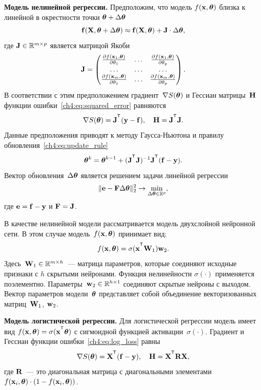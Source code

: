 \documentclass[11pt, a5paper]{dissert}
\begin{document}
\textbf{Модель нелинейной регрессии.}
Предположим, что модель $f (\mathbf{x} , \boldsymbol{\theta})$ близка к линейной в окрестности точки $\boldsymbol{\theta} + \Delta \boldsymbol{\theta}$
\[
	\mathbf{f}(\mathbf{X} , \boldsymbol{\theta} + \Delta \boldsymbol{\theta}) \approx \mathbf{f}(\mathbf{X} , \boldsymbol{\theta}) + \mathbf{J} \cdot \Delta  \boldsymbol{\theta},
\]
где $\mathbf{J} \in \mathbb{R}^{m \times p}$ является матрицой Якоби
\begin{equation*}
	\mathbf{J} = 
	\begin{pmatrix}
		\frac{\partial f(\mathbf{x}_1 , \boldsymbol{\theta})}{\partial \theta_1} & \dots & 
		\frac{\partial f(\mathbf{x}_1 , \boldsymbol{\theta})}{\partial \theta_p} \\
		\dots & \dots & \dots \\
		\frac{\partial f(\mathbf{x}_m , \boldsymbol{\theta})}{\partial \theta_1} & \dots & 
		\frac{\partial f(\mathbf{x}_m , \boldsymbol{\theta})}{\partial \theta_p}
	\end{pmatrix}.
\end{equation*}
В соответствии с этим предположением градиент~$\nabla S(\boldsymbol{\theta})$ и Гессиан матрицы~$\mathbf{H}$ функции ошибки~\eqref{ch4:eq:squared_error} равняются
\begin{equation}
	\nabla S(\btheta) = \bJ^{\T} (\by - \mathbf{f}), \quad \bH = \bJ^{\T} \bJ.
	\label{ch4:eq:nonlin_reg_deriv}
\end{equation}
Данные предположения приводят к методу Гаусса-Ньютона и правилу обновления~\eqref{ch4:eq:update_rule}
\[
	\btheta^k = \btheta^{k - 1} + (\bJ^{\T} \bJ)^{-1}\bJ^{\T}(\mathbf{f} - \by).
\]
Вектор обновления~$\Delta \boldsymbol{\theta}$ является решением задачи линейной регрессии
\begin{equation}
	\| \mathbf{e} - \mathbf{F} \Delta \boldsymbol{\theta} \|_2^2 \rightarrow \min_{\Delta \boldsymbol{\theta} \in \mathbb{R}^{p}},
	\label{ch4:eq:lin_reg_nonlin_reg}
\end{equation}
где $\mathbf{e} = \mathbf{f} - \mathbf{y}$ и $\mathbf{F} = \mathbf{J}$.

В качестве нелинейной модели рассматривается модель двухслойной нейронной сети. В этом случае модель~$f (\mathbf{x}, \boldsymbol{\theta})$ принимает вид:
\[
	f(\bx, \btheta) = \sigma(\bx^{\T} \bW_1) \bw_2.
\]
Здесь~$\mathbf{W}_1 \in \mathbb{R}^{m \times h}$~--- матрица параметров, которые соединяют исходные признаки с $h$ скрытыми нейронами. Функция нелинейности $\sigma(\cdot)$ применяется поэлементно. Параметры~$\mathbf{w}_2 \in \mathbb{R}^{h \times 1}$ соединяют скрытые нейроны с выходом. 
Вектор параметров модели~$\boldsymbol{\theta}$ представляет собой объединение векторизованных матриц~$\mathbf{W}_1$, $\mathbf{w}_2$.

\textbf{Модель логистической регрессии.}
Для логистической регрессии модель имеет вид $f(\bx , \btheta) = \sigma(\bx^{\T} \btheta)$ с сигмоидной функцией активации~$\sigma(\cdot)$.
Градиент и Гессиан функции ошибки~\eqref{ch4:eq:log_loss} равны
\begin{equation}
	\nabla S(\btheta) = \bX^{\T} (\mathbf{f} - \by), \quad \bH = \bX^{\T} \bR \bX,
	\label{ch4:eq:log_reg_deriv}
\end{equation}
где $\mathbf{R}$~--- это диагональная матрица с диагональными элементами $f(\mathbf{x}_i , \boldsymbol{\theta}) \cdot (1 - f(\mathbf{x}_i , \boldsymbol{\theta}))$.
\end{document}
